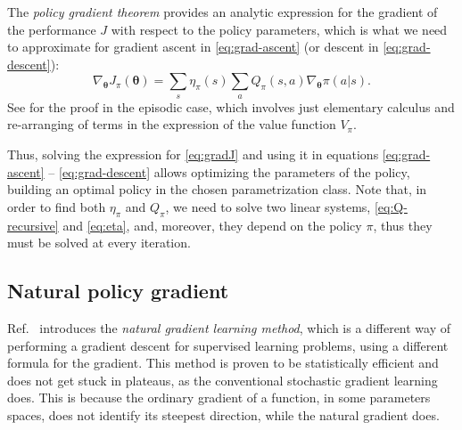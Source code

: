 The \emph{policy gradient theorem} provides an analytic expression for the gradient of the performance $J$ with respect to the policy parameters, which is what we need to approximate for gradient ascent in \eqref{eq:grad-ascent} (or descent in \eqref{eq:grad-descent}):
\begin{equation}
    \nabla_{\boldsymbol \theta} J_\pi(\boldsymbol \theta) = \sum_s \eta_\pi(s) \sum_a Q_\pi(s, a) \nabla_{\boldsymbol \theta} \pi(a|s).
    \label{eq:gradJ}
\end{equation}
See \cite{SuttonBarto} for the proof in the episodic case, which involves just elementary calculus and re-arranging of terms in the expression of the value function $V_\pi$. %

Thus, solving the expression for \eqref{eq:gradJ} and using it in equations \eqref{eq:grad-ascent} -- \eqref{eq:grad-descent} allows optimizing the parameters of the policy, building an optimal policy in the chosen parametrization class. Note that, in order to find both $\eta_\pi$ and $Q_\pi$, we need to solve two linear systems, \eqref{eq:Q-recursive} and \eqref{eq:eta}, and, moreover, they depend on the policy $\pi$, thus they must be solved at every iteration.


\subsection{Natural policy gradient}
\label{sec:npg}

Ref.~\cite{Amari1998} introduces the \emph{natural gradient learning method}, which is a different way of performing a gradient descent for supervised learning problems, using a different formula for the gradient. This method is proven to be statistically efficient and does not get stuck in plateaus, as the conventional stochastic gradient learning does. This is because the ordinary gradient of a function, in some parameters spaces, does not identify its steepest direction, while the natural gradient does.

